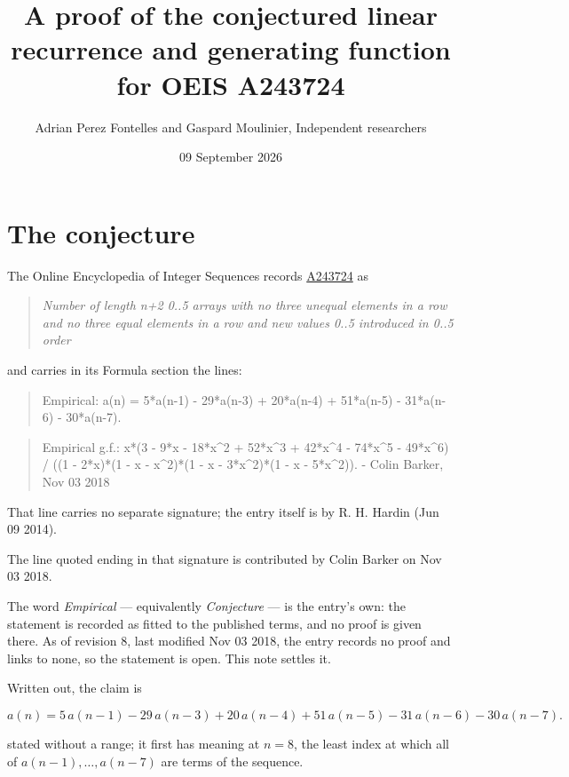 \documentclass[11pt]{article}
\title{A proof of the conjectured linear recurrence and generating function for OEIS A243724}
\author{Adrian Perez Fontelles and Gaspard Moulinier, Independent researchers}
\date{09 September 2026}
\theoremstyle{definition}
\begin{document}
\maketitle
\section{The conjecture}

The Online Encyclopedia of Integer Sequences records \href{https://oeis.org/A243724}{A243724} as

\begin{quote}\itshape Number of length n+2 0..5 arrays with no three unequal elements in a row and no three equal elements in a row and new values 0..5 introduced in 0..5 order\end{quote}

and carries in its Formula section the lines:

\begin{quote}\ttfamily Empirical: a(n) = 5*a(n-1) - 29*a(n-3) + 20*a(n-4) + 51*a(n-5) - 31*a(n-6) - 30*a(n-7).\end{quote}

\begin{quote}\ttfamily Empirical g.f.: x*(3 - 9*x - 18*x\textasciicircum{}2 + 52*x\textasciicircum{}3 + 42*x\textasciicircum{}4 - 74*x\textasciicircum{}5 - 49*x\textasciicircum{}6) / ((1 - 2*x)*(1 - x - x\textasciicircum{}2)*(1 - x - 3*x\textasciicircum{}2)*(1 - x - 5*x\textasciicircum{}2)). - Colin Barker, Nov 03 2018\end{quote}

That line carries no separate signature; the entry itself is by R. H. Hardin (Jun 09 2014).

The line quoted ending in that signature is contributed by Colin Barker on Nov 03 2018.

The word {\itshape Empirical} --- equivalently {\itshape Conjecture} --- is the entry's own: the statement is recorded as fitted to the published terms, and no proof is given there. As of revision 8, last modified Nov 03 2018, the entry records no proof and links to none, so the statement is open. This note settles it.

Written out, the claim is

\[a(n) = 5\,a(n-1) - 29\,a(n-3) + 20\,a(n-4) + 51\,a(n-5) - 31\,a(n-6) - 30\,a(n-7).\]

stated without a range; it first has meaning at $n = 8$, the least index at which all of $a(n-1),\dots,a(n-7)$ are terms of the sequence.
\end{document}
